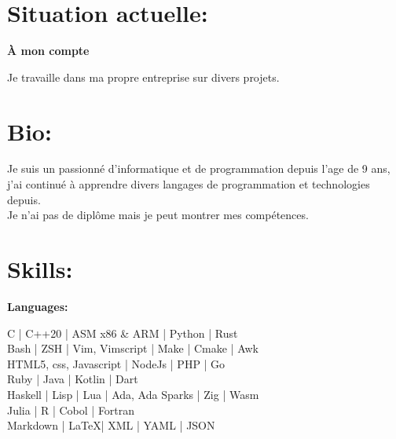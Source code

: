 \documentclass[a4paper,10pt]{article}
\begin{document}
\begin{adjustbox}{valign=t}
\begin{minipage}{0.6\textwidth} %
\section*{Situation actuelle:}
\begin{description}
\raggedright
\item[\normalfont \textcolor{ColorOne}{Sept. 2021 -- Maintenant.}] \textbf{À mon compte}\\ \medskip

Je travaille dans ma propre entreprise sur divers projets.

\vspace{-0.9\baselineskip}
\end{description}

\section*{Bio:}
\begin{spacing}{1.0}

\vspace{-0.6\baselineskip}

\hspace{5mm} Je suis un passionné d'informatique et de programmation depuis l'age de 9 ans, j'ai continué à apprendre divers langages de programmation
	et technologies depuis.\\
Je n'ai pas de diplôme mais je peut montrer mes compétences.
\end{spacing}
\vspace{-0.8\baselineskip}
\section*{Skills:}
\begin{description}
\begin{spacing}{0.95}
\item{\textbf{Languages:}}

    C | C++20 | ASM x86 \& ARM | Python | Rust \\
    Bash | ZSH | Vim, Vimscript | Make | Cmake | Awk\\
    HTML5, css, Javascript | NodeJs | PHP | Go\\
    Ruby | Java | Kotlin | Dart\\
    Haskell | Lisp | Lua | Ada, Ada Sparks | Zig | Wasm\\
    Julia | R | Cobol | Fortran \\
    Markdown | \LaTeX | XML | YAML | JSON


\end{spacing}
\end{description}
\end{minipage}
\end{adjustbox}
\end{document}
